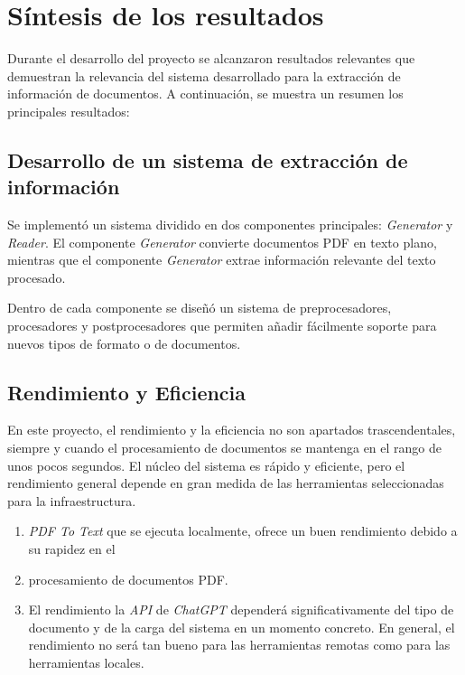 \section{Síntesis de los resultados}

Durante el desarrollo del proyecto se alcanzaron resultados relevantes que demuestran la relevancia del sistema
desarrollado para la extracción de información de documentos.
A continuación, se muestra un resumen los principales resultados:

\subsection{Desarrollo de un sistema de extracción de información}

Se implementó un sistema dividido en dos componentes principales: \textit{Generator} y \textit{Reader}.
El componente \textit{Generator} convierte documentos PDF en texto plano, mientras que el componente \textit{Generator}
extrae información relevante del texto procesado.

Dentro de cada componente se diseñó un sistema de preprocesadores, procesadores y postprocesadores que permiten
añadir fácilmente soporte para nuevos tipos de formato o de documentos.

\subsection{Rendimiento y Eficiencia}

En este proyecto, el rendimiento y la eficiencia no son apartados trascendentales, siempre y cuando el procesamiento de
documentos se mantenga en el rango de unos pocos segundos.
El núcleo del sistema es rápido y eficiente, pero el rendimiento general depende en gran medida de las herramientas
seleccionadas para la infraestructura.

\begin{enumerate}
    \item \textit{PDF To Text} que se ejecuta localmente, ofrece un buen rendimiento debido a su rapidez en el
    \item procesamiento de documentos PDF.
    \item El rendimiento la \textit{API} de \textit{ChatGPT} dependerá significativamente del tipo de documento y de la
    carga del sistema en un momento concreto.
    En general, el rendimiento no será tan bueno para las herramientas remotas como para las herramientas locales.
\end{enumerate}


